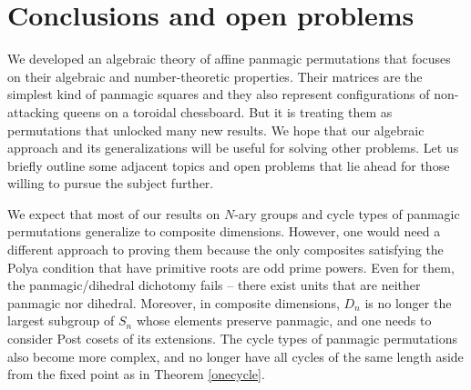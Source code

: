 \documentclass[11pt]{article}
\makeatletter
\renewcommand{\pmod}{%
  \allowbreak
  \if@display\mkern18mu\else\mkern8mu\fi
  \pmodx
}
\theoremstyle{plain}
\theoremstyle{definition}
\newcommand{\+}[1]{{#1}^\times}
\def\k{{\varkappa}}
\makeatother
\begin{document}
\section{Conclusions and open problems}


We developed an algebraic  theory of affine panmagic permutations that focuses on their algebraic and number-theoretic properties. Their matrices are the simplest kind of panmagic squares and they also represent configurations of non-attacking queens on a toroidal chessboard. But it is treating them as permutations that unlocked many new results. We hope that our algebraic approach and its generalizations will be useful for solving other problems. Let us briefly outline some adjacent topics and open problems that lie ahead for those willing to pursue the subject further.

We expect that most of our results on $N$-ary groups and cycle types of panmagic permutations generalize to composite dimensions. However, one would need a different approach to proving them because the only composites satisfying the Polya condition that have primitive roots are odd prime powers. Even for them, the panmagic/dihedral dichotomy fails -- there exist units that are neither panmagic nor dihedral. Moreover, in composite dimensions, $D_n$ is no longer the largest subgroup of $S_n$ whose elements preserve panmagic, and one needs to consider Post cosets of its extensions. The cycle types of panmagic permutations also become more complex, and no longer have all cycles of the same length aside from the fixed point as in Theorem \ref{onecycle}.

\end{document}

